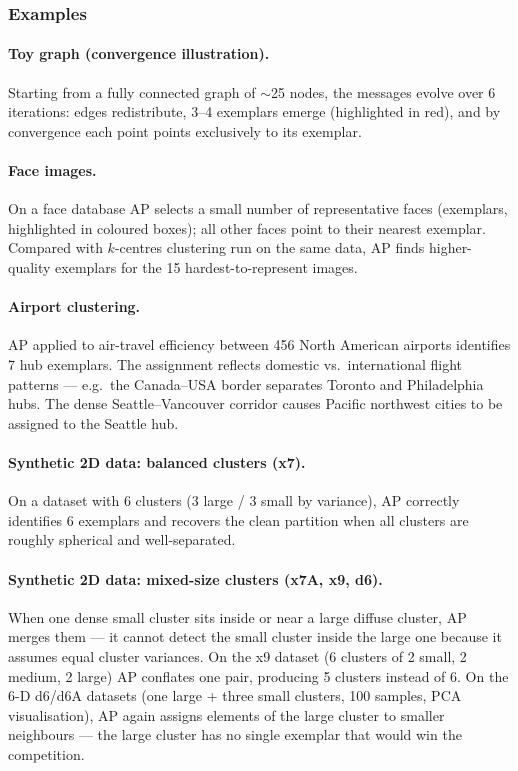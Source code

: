 \documentclass[11pt, oneside]{book}
\begin{document}
\subsubsection{Examples}

\paragraph{Toy graph (convergence illustration).}
Starting from a fully connected graph of $\sim$25 nodes, the messages evolve
over 6 iterations: edges redistribute, 3–4 exemplars emerge (highlighted in
red), and by convergence each point points exclusively to its exemplar.

\paragraph{Face images.}
On a face database AP selects a small number of representative faces
(exemplars, highlighted in coloured boxes); all other faces point to their
nearest exemplar.
Compared with $k$-centres clustering run on the same data,
AP finds higher-quality exemplars for the 15 hardest-to-represent images.

\paragraph{Airport clustering.}
AP applied to air-travel efficiency between 456 North American airports
identifies 7 hub exemplars.
The assignment reflects domestic vs.\ international flight patterns —
e.g.\ the Canada–USA border separates Toronto and Philadelphia hubs.
The dense Seattle–Vancouver corridor causes Pacific northwest cities to be
assigned to the Seattle hub.

\paragraph{Synthetic 2D data: balanced clusters (x7).}
On a dataset with 6 clusters (3 large / 3 small by variance), AP correctly
identifies 6 exemplars and recovers the clean partition when all clusters are
roughly spherical and well-separated.

\paragraph{Synthetic 2D data: mixed-size clusters (x7A, x9, d6).}
When one dense small cluster sits inside or near a large diffuse cluster,
AP merges them — it cannot detect the small cluster inside the large one
because it assumes equal cluster variances.
On the x9 dataset (6 clusters of 2 small, 2 medium, 2 large) AP conflates
one pair, producing 5 clusters instead of 6.
On the 6-D d6/d6A datasets (one large + three small clusters, 100 samples,
PCA visualisation), AP again assigns elements of the large cluster to smaller
neighbours — the large cluster has no single exemplar that would win the
competition.
\end{document}
